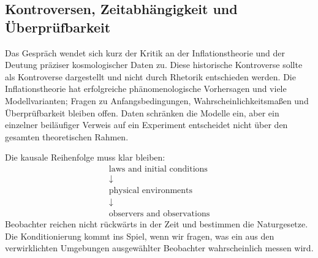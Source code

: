 \subsection{Kontroversen, Zeitabhängigkeit und Überprüfbarkeit}

Das Gespräch wendet sich kurz der Kritik an der Inflationstheorie und der Deutung präziser kosmologischer Daten zu. Diese historische Kontroverse sollte als Kontroverse dargestellt und nicht durch Rhetorik entschieden werden. Die Inflationstheorie hat erfolgreiche phänomenologische Vorhersagen und viele Modellvarianten; Fragen zu Anfangsbedingungen, Wahrscheinlichkeitsmaßen und Überprüfbarkeit bleiben offen. Daten schränken die Modelle ein, aber ein einzelner beiläufiger Verweis auf ein Experiment entscheidet nicht über den gesamten theoretischen Rahmen.

\begin{classroomqa}
\end{classroomqa}

\begin{classroomqa}
\end{classroomqa}

Die kausale Reihenfolge muss klar bleiben:
\begin{equation}
\begin{gathered}
\text{laws and initial conditions}\\[-0.15em]
\downarrow\\[-0.15em]
\text{physical environments}\\[-0.15em]
\downarrow\\[-0.15em]
\text{observers and observations}
\end{gathered}
\end{equation}
Beobachter reichen nicht rückwärts in der Zeit und bestimmen die Naturgesetze. Die Konditionierung kommt ins Spiel, wenn wir fragen, was ein aus den verwirklichten Umgebungen ausgewählter Beobachter wahrscheinlich messen wird.

